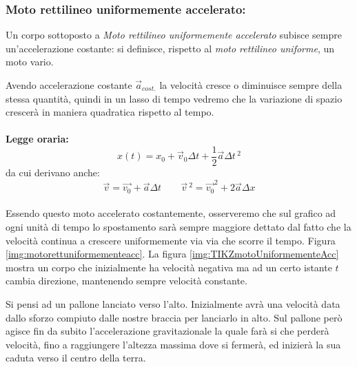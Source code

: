 \subsubsection{Moto rettilineo uniformemente accelerato:}Un corpo sottoposto a \textit{Moto rettilineo uniformemente accelerato} subisce sempre un'accelerazione costante: si definisce, rispetto al \textit{moto rettilineo uniforme}, un moto vario.

Avendo accelerazione costante $\vec{a}_{cost.}$ la velocità cresce o diminuisce sempre della stessa quantità, quindi in un lasso di tempo vedremo che la variazione di spazio crescerà in maniera quadratica rispetto al tempo.

\paragraph{}
\textbf{Legge oraria:}
\begin{equation}
\label{leggeOrunifacc}
    x(t) = x_0 + \vec{v}_0\Delta t+\frac{1}{2}\vec{a}\Delta t\,^2
\end{equation}
da cui derivano anche:
\begin{equation*}
    \vec{v}=\vec{v_0} + \vec{a}\Delta t \qquad{} \vec{v}\,^2 = \vec{v_0}^2 + 2\vec{a}\Delta x
\end{equation*}
\paragraph{}

Essendo questo moto accelerato costantemente, osserveremo che sul grafico ad ogni unità di tempo lo spostamento sarà sempre maggiore dettato dal fatto che la velocità continua a crescere uniformemente via via che scorre il tempo. Figura \ref{img:motorettuniformementeacc}.
La figura \ref{img:TIKZmotoUniformementeAcc} mostra un corpo che inizialmente ha velocità negativa ma ad un certo istante $t$ cambia direzione, mantenendo sempre velocità constante.


Si pensi ad un pallone lanciato verso l'alto. Inizialmente avrà una velocità data dallo sforzo compiuto dalle nostre braccia per lanciarlo in alto. Sul pallone però agisce fin da subito l'accelerazione gravitazionale la quale farà si che perderà velocità, fino a raggiungere l'altezza massima dove si fermerà, ed inizierà la sua caduta verso il centro della terra. 


